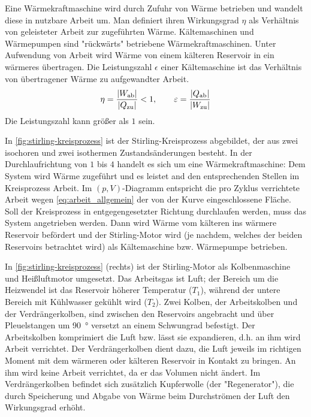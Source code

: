 Eine Wärmekraftmaschine wird durch Zufuhr von Wärme betrieben und wandelt diese in nutzbare Arbeit um. Man definiert ihren Wirkungsgrad $\eta$ als Verhältnis von geleisteter Arbeit zur zugeführten Wärme. Kältemaschinen und Wärmepumpen sind "rückwärts" betriebene Wärmekraftmaschinen. Unter Aufwendung von Arbeit wird Wärme von einem kälteren Reservoir in ein wärmeres übertragen. Die Leistungszahl $\epsilon$ einer Kältemaschine ist das Verhältnis von übertragener Wärme zu aufgewandter Arbeit.
\begin{equation}\label{eq:wirkungsgrad_leistungszahl}
	\eta = \frac{\abs{W_\text{ab}}}{\abs{Q_\text{zu}}} < 1, \qquad
	\epsilon = \frac{\abs{Q_\text{ab}}}{\abs{W_\text{zu}}}
\end{equation}
Die Leistungszahl kann größer als $1$ sein.

In \cref{fig:stirling-kreisprozess} ist der Stirling-Kreisprozess abgebildet, der aus zwei isochoren und zwei isothermen Zustandsänderungen besteht. In der Durchlaufrichtung von $1$ bis $4$ handelt es sich um eine Wärmekraftmaschine: Dem System wird
Wärme zugeführt und es leistet and den entsprechenden Stellen im Kreisprozess Arbeit. Im $(p, V)$-Diagramm entspricht die pro Zyklus verrichtete Arbeit wegen \cref{eq:arbeit_allgemein} der von der Kurve eingeschlossene Fläche. Soll der Kreisprozess in entgegengesetzter Richtung durchlaufen werden, muss das System
angetrieben werden. Dann wird Wärme vom kälteren ins wärmere Reservoir befördert und der Stirling-Motor wird (je nachdem, welches der beiden Reservoirs betrachtet wird) als Kältemaschine bzw. Wärmepumpe betrieben.

In \cref{fig:stirling-kreisprozess} (rechts) ist der Stirling-Motor als Kolbenmaschine und Heißluftmotor umgesetzt. Das Arbeitsgas ist Luft; der Bereich um die Heizwendel ist das Reservoir höherer Temperatur ($T_1$), während der untere Bereich mit Kühlwasser gekühlt wird ($T_2$). Zwei Kolben, der Arbeitskolben und der Verdrängerkolben, sind zwischen den Reservoirs angebracht und über Pleuelstangen um \SI{90}{\degree} versetzt an einem Schwungrad befestigt. Der Arbeitskolben komprimiert die Luft bzw. lässt sie expandieren, d.h. %
an ihm wird Arbeit verrichtet. Der Verdrängerkolben dient dazu, die Luft jeweils im richtigen Moment mit dem wärmeren oder kälteren Reservoir in Kontakt zu bringen. An ihm wird keine Arbeit verrichtet, da er das Volumen nicht ändert. Im Verdrängerkolben befindet sich zusätzlich Kupferwolle (der "Regenerator"), die durch Speicherung und Abgabe von Wärme beim Durchströmen der Luft den Wirkungsgrad erhöht.

